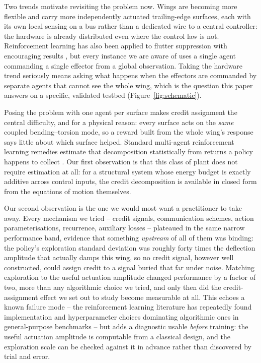 \documentclass[preprint,11pt]{elsarticle}
\begin{document}
Two trends motivate revisiting the problem now. Wings are becoming more
flexible and carry more independently actuated trailing-edge surfaces, each
with its own local sensing on a bus rather than a dedicated wire to a
central controller: the hardware is already distributed even where the
control law is not. Reinforcement learning has also been applied to flutter
suppression with encouraging results
\cite{circulation2023,stallflutter2025,flyingwing2022}, but every instance
we are aware of uses a single agent commanding a single effector from a
global observation. Taking the hardware trend seriously means asking what
happens when the effectors are commanded by separate agents that cannot see
the whole wing, which is the question this paper answers on a specific,
validated testbed (Figure~\ref{fig:schematic}).

Posing the problem with one agent per surface makes credit assignment the
central difficulty, and for a physical reason: every surface acts on the
\emph{same} coupled bending--torsion mode, so a reward built from the whole
wing's response says little about which surface helped. Standard
multi-agent reinforcement learning remedies estimate that decomposition
statistically from returns a policy happens to collect
\cite{sunehag2018vdn,rashid2018qmix,foerster2018coma}. Our first observation
is that this class of plant does not require estimation at all: for a
structural system whose energy budget is exactly additive across control
inputs, the credit decomposition is available in closed form from the
equations of motion themselves.

Our second observation is the one we would most want a practitioner to take
away. Every mechanism we tried -- credit signals, communication schemes,
action parameterisations, recurrence, auxiliary losses -- plateaued in the
same narrow performance band, evidence that something \emph{upstream} of
all of them was binding: the policy's exploration standard deviation was
roughly forty times the deflection amplitude that actually damps this wing,
so no credit signal, however well constructed, could assign credit to a
signal buried that far under noise. Matching exploration to the useful
actuation amplitude changed performance by a factor of two, more than any
algorithmic choice we tried, and only then did the credit-assignment effect
we set out to study become measurable at all. This echoes a known failure
mode -- the reinforcement learning literature has repeatedly found
implementation and hyperparameter choices dominating algorithmic ones in
general-purpose benchmarks \cite{henderson2018matters,
engstrom2020implementation,andrychowicz2021what} -- but adds a diagnostic
usable \emph{before} training: the useful actuation amplitude is computable
from a classical design, and the exploration scale can be checked against
it in advance rather than discovered by trial and error.
\end{document}
